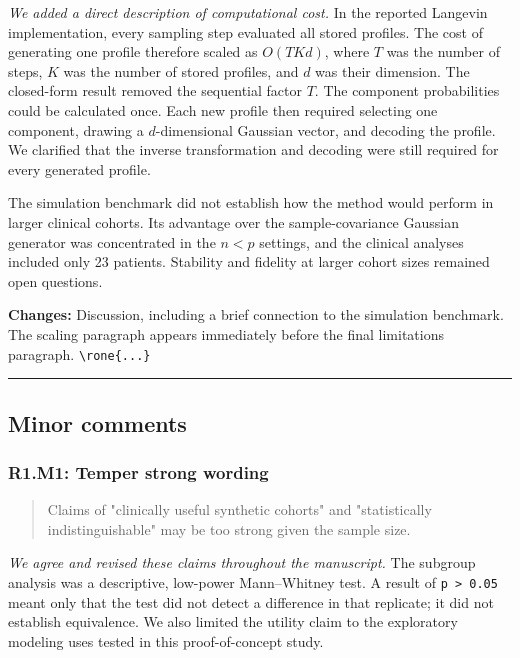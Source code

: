 \documentclass[
  11pt,
  letterpaper,
]{article}
\begin{document}
\emph{We added a direct description of computational cost.} In the reported Langevin implementation, every sampling step evaluated all stored profiles. The cost of generating one profile therefore scaled as \(O(TKd)\), where \(T\) was the number of steps, \(K\) was the number of stored profiles, and \(d\) was their dimension. The closed-form result removed the sequential factor \(T\). The component probabilities could be calculated once. Each new profile then required selecting one component, drawing a \(d\)-dimensional Gaussian vector, and decoding the profile. We clarified that the inverse transformation and decoding were still required for every generated profile.

The simulation benchmark did not establish how the method would perform in larger clinical cohorts. Its advantage over the sample-covariance Gaussian generator was concentrated in the \(n<p\) settings, and the clinical analyses included only 23 patients. Stability and fidelity at larger cohort sizes remained open questions.

\textbf{Changes:} Discussion, including a brief connection to the simulation benchmark. The scaling paragraph appears immediately before the final limitations paragraph. \texttt{\textbackslash{}rone\{...\}}

\begin{center}\rule{0.5\linewidth}{0.5pt}\end{center}

\subsection{Minor comments}\label{minor-comments}

\subsubsection{R1.M1: Temper strong wording}\label{r1m1-temper-strong-wording}

\begin{quote}
Claims of "clinically useful synthetic cohorts" and "statistically indistinguishable" may be too strong given the sample size.
\end{quote}

\emph{We agree and revised these claims throughout the manuscript.} The subgroup analysis was a descriptive, low-power Mann--Whitney test. A result of \texttt{p\ \textgreater{}\ 0.05} meant only that the test did not detect a difference in that replicate; it did not establish equivalence. We also limited the utility claim to the exploratory modeling uses tested in this proof-of-concept study.
\end{document}
